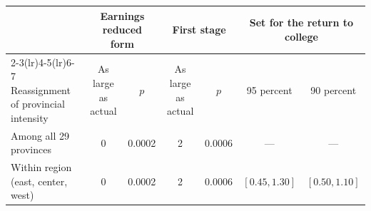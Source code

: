 \begin{tabular}{@{}lcccccc@{}}
\toprule
 & \multicolumn{2}{c}{Earnings reduced form} & \multicolumn{2}{c}{First stage} & \multicolumn{2}{c}{Set for the return to college} \\
\cmidrule(lr){2-3}\cmidrule(lr){4-5}\cmidrule(lr){6-7}
Reassignment of provincial intensity & As large as actual & $p$ & As large as actual & $p$ & 95 percent & 90 percent \\
\midrule
Among all 29 provinces & 0 & 0.0002 & 2 & 0.0006 & --- & --- \\
Within region (east, center, west) & 0 & 0.0002 & 2 & 0.0006 & $[0.45, 1.30]$ & $[0.50, 1.10]$ \\
\bottomrule
\end{tabular}
